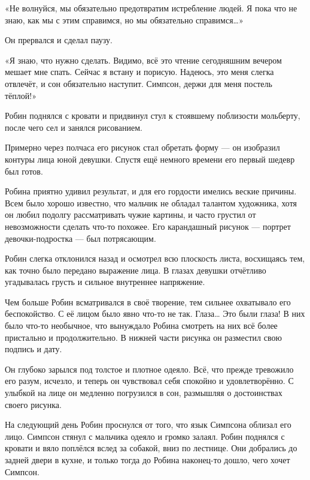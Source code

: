 \documentclass[a4paper,12pt]{book}
\begin{document}
\par
«Не волнуйся, мы обязательно предотвратим истребление людей. Я пока что не знаю, как мы с этим справимся, но мы обязательно справимся…»
\par
Он прервался и сделал паузу.
\par
«Я знаю, что нужно сделать. Видимо, всё это чтение сегодняшним вечером мешает мне спать. Сейчас я встану и порисую. Надеюсь, это меня слегка отвлечёт, и сон обязательно наступит. Симпсон, держи для меня постель тёплой!»\\
\par
Робин поднялся с кровати и придвинул стул к стоявшему поблизости мольберту, после чего сел и занялся рисованием.
\par
Примерно через полчаса его рисунок стал обретать форму — он изобразил контуры лица юной девушки. Спустя ещё немного времени его первый шедевр был готов.
\par
Робина приятно удивил результат, и для его гордости имелись веские причины. Всем было хорошо известно, что мальчик не обладал талантом художника, хотя он любил подолгу рассматривать чужие картины, и часто грустил от невозможности сделать что-то похожее. Его карандашный рисунок — портрет девочки-подростка — был потрясающим.
\par
Робин слегка отклонился назад и осмотрел всю плоскость листа, восхищаясь тем, как точно было передано выражение лица. В глазах девушки отчётливо угадывалась грусть и сильное внутреннее напряжение.\\
\par
Чем больше Робин всматривался в своё творение, тем сильнее охватывало его беспокойство. С её лицом было явно что-то не так. Глаза… Это были глаза! В них было что-то необычное, что вынуждало Робина смотреть на них всё более пристально и продолжительно. В нижней части рисунка он разместил свою подпись и дату.\\
\par
Он глубоко зарылся под толстое и плотное одеяло. Всё, что прежде тревожило его разум, исчезло, и теперь он чувствовал себя спокойно и удовлетворённо. С улыбкой на лице он медленно погрузился в сон, размышляя о достоинствах своего рисунка.\\
\par
На следующий день Робин проснулся от того, что язык Симпсона облизал его лицо. Симпсон стянул с мальчика одеяло и громко залаял. Робин поднялся с кровати и вяло поплёлся вслед за собакой, вниз по лестнице. Они добрались до задней двери в кухне, и только тогда до Робина наконец-то дошло, чего хочет Симпсон.\\
\end{document}
